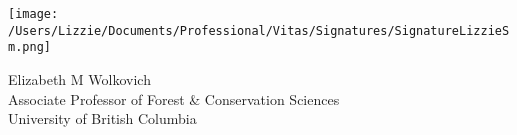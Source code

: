 \documentclass[11pt,a4paper]{article}
\begin{document}
\texttt{[image: /Users/Lizzie/Documents/Professional/Vitas/Signatures/SignatureLizzieSm.png]} 

\noindent Elizabeth M Wolkovich\\
Associate Professor of Forest \& Conservation Sciences\\ 
University of British Columbia


\end{document}
